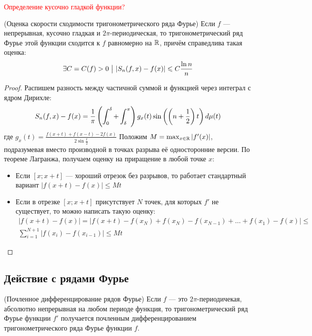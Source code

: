 \begin{definition}
	\textcolor{red}{Определение кусочно гладкой функции?}
\end{definition}

\begin{theorem} (Оценка скорости сходимости тригонометрического ряда Фурье)
	Если $f$ --- непрерывная, кусочно гладкая и $2\pi$-периодическая, то тригонометрический ряд Фурье этой функции сходится к $f$ равномерно на $\mathbb{R}$, причём справедлива такая оценка:
	\[
		\exists C = C(f) > 0 \ \big|\  |S_n(f, x) - f(x)| \leqslant C\frac{\ln n}{n}
	\]
\end{theorem}

\begin{proof}
	Распишем разность между частичной суммой и функцией через интеграл с ядром Дирихле:
	\[
		S_n(f, x) - f(x) = \frac{1}{\pi} \left(\int_0^\delta + \int_\delta^\pi\right) g_x(t)\sin\left(\left(n + \frac{1}{2}\right)t\right)d\mu(t)
	\]
	где $g_x(t) = \frac{f(x + t) + f(x - t) - 2f(x)}{2\sin\frac{t}{2}}$
	Положим $M = \max_{x \in \mathbb{R}} |f'(x)|$, подразумевая вместо производной в точках разрыва её односторонние версии. По теореме Лагранжа, получаем оценку на приращение в любой точке $x$:
	\begin{itemize}
		\item Если $[x; x + t]$ --- хороший отрезок без разрывов, то работает стандартный вариант \(|f(x + t) - f(x)| \le Mt\)
		
		\item Если в отрезке $[x; x + t]$ присутствует $N$ точек, для которых $f'$ не существует, то можно написать такую оценку:
		\begin{multline*}
			|f(x + t) - f(x)| = |f(x + t) - f(x_N) + f(x_N) - f(x_{N - 1}) + \ldots + f(x_1) - f(x)| \le
			\\
			\sum_{i = 1}^{N + 1} |f(x_i) - f(x_{i - 1})| \le Mt
		\end{multline*}
		
	\end{itemize}
\end{proof}

\subsection{Действие с рядами Фурье}

\begin{theorem} (Почленное дифференцирование рядов Фурье) Если $f$ --- это $2\pi$-периодичекая, абсолютно непрерывная на любом периоде функция, то тригонометрический ряд Фурье функции $f'$ получается почленным дифференцированием тригонометрического ряда Фурье функции $f$.
\end{theorem}

